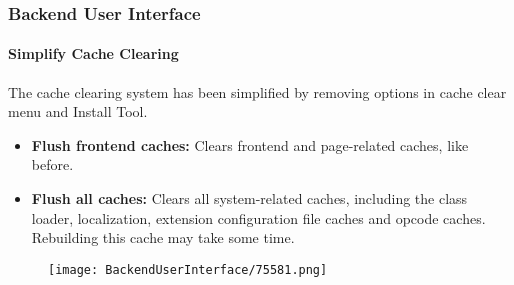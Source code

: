 \begin{frame}[fragile]
	\frametitle{Backend User Interface}
	\framesubtitle{Simplify Cache Clearing}

	The cache clearing system has been simplified by removing options in cache clear menu and
	Install Tool.

	\begin{itemize}

		\item \textbf{Flush frontend caches:}\newline
			\small
				Clears frontend and page-related caches, like before.
			\normalsize

		\item \textbf{Flush all caches:}\newline
			\small
				Clears all system-related caches, including the class loader, localization,
				extension configuration file caches and opcode caches. Rebuilding this cache
				may take some time.
			\normalsize

	\end{itemize}

	\begin{figure}
		\texttt{[image: BackendUserInterface/75581.png]}
	\end{figure}

\end{frame}


